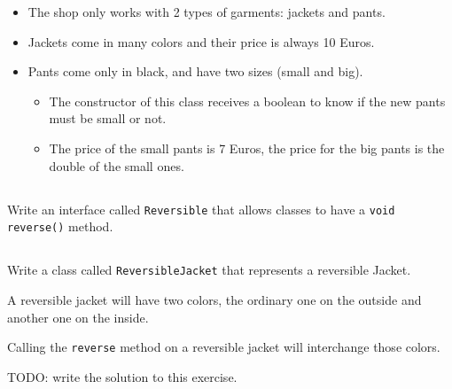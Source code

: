 \documentclass[a4paper, 11pt]{article}
\begin{document}
\begin{itemize}

  \item The shop only works with 2 types of garments: jackets and pants.

  \item Jackets come in many colors and their price is always 10 Euros.

  \item Pants come only in black, and have two sizes (small and big).

    \begin{itemize}

      \item The constructor of this class receives a boolean to know if the new
        pants must be small or not.

      \item The price of the small pants is 7 Euros, the price for the big
        pants is the double of the small ones.

    \end{itemize}

\end{itemize}



\subsection{}

Write an interface called \texttt{Reversible} that allows classes to have a
\texttt{void reverse()} method.


\subsection{}

Write a class called \texttt{ReversibleJacket} that represents a reversible
Jacket.

A reversible jacket will have two colors, the ordinary one on the outside and
another one on the inside.

Calling the \texttt{reverse} method on a reversible jacket will interchange
those colors.

\begin{solution}
TODO: write the solution to this exercise.
\end{solution}
\end{document}
